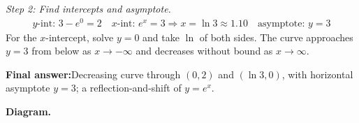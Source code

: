 \documentclass[11pt]{article}
\begin{document}
\textit{Step 2: Find intercepts and asymptote.}
\[\begin{gathered}
y\text{-int: } 3 - e^{0} = 2 \quad x\text{-int: } e^{x} = 3 \Rightarrow x = \ln 3 \approx 1.10 \quad \text{asymptote: } y = 3
\end{gathered}\]
For the \( x \)-intercept, solve \( y = 0 \) and take \( \ln \) of both sides. The curve approaches \( y = 3 \) from below as \( x \to -\infty \) and decreases without bound as \( x \to \infty \).

\begin{answerbox}
\textbf{Final answer:}\quad Decreasing curve through \(\displaystyle (0, 2)\) and \(\displaystyle (\ln 3, 0)\), with horizontal asymptote \(\displaystyle  y = 3 \); a reflection-and-shift of \(\displaystyle  y = e^{x} \).
\end{answerbox}
\textbf{Diagram.}
\end{document}
